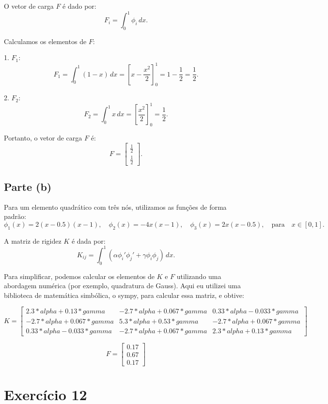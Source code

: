 \documentclass{article}
\begin{document}
O vetor de carga \( F \) é dado por:
\[
F_i = \int_0^1 \phi_i \, dx.
\]

Calculamos os elementos de \( F \):

1. \( F_1 \):
\[
F_1 = \int_0^1 (1 - x) \, dx = \left[ x - \frac{x^2}{2} \right]_0^1 = 1 - \frac{1}{2} = \frac{1}{2}.
\]

2. \( F_2 \):
\[
F_2 = \int_0^1 x \, dx = \left[ \frac{x^2}{2} \right]_0^1 = \frac{1}{2}.
\]

Portanto, o vetor de carga \( F \) é:
\[
F = \begin{bmatrix}
\frac{1}{2} \\
\frac{1}{2}
\end{bmatrix}.
\]

\subsection{Parte (b)}

Para um elemento quadrático com três nós, utilizamos as funções de forma padrão:
\[
\phi_1(x) = 2(x - 0.5)(x - 1), \quad \phi_2(x) = -4x(x - 1), \quad \phi_3(x) = 2x(x - 0.5), \quad \text{para} \quad x \in [0, 1].
\]

A matriz de rigidez \( K \) é dada por:
\[
K_{ij} = \int_0^1 (\alpha \phi_i' \phi_j' + \gamma \phi_i \phi_j) \, dx.
\]

Para simplificar, podemos calcular os elementos de \( K \) e \( F \) utilizando uma abordagem numérica (por exemplo, quadratura de Gauss). Aqui eu utilizei uma biblioteca de matemática simbólica, o sympy, para calcular essa matriz, e obtive:

\[
K = \begin{bmatrix}
    2.3*alpha + 0.13*gamma & -2.7*alpha + 0.067*gamma & 0.33*alpha - 0.033*gamma \\
    -2.7*alpha + 0.067*gamma & 5.3*alpha + 0.53*gamma & -2.7*alpha + 0.067*gamma \\
    0.33*alpha - 0.033*gamma & -2.7*alpha + 0.067*gamma & 2.3*alpha + 0.13*gamma
\end{bmatrix}
\]

\[
F = \begin{bmatrix}
    0.17 \\
    0.67 \\
    0.17
\end{bmatrix}
\]

\section{Exercício 12}
\end{document}
